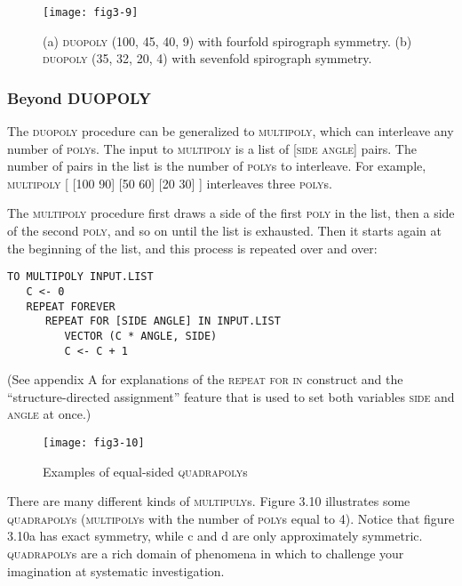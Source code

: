 \documentclass{book}
\begin{document}
\begin{figure}
\begin{center}
\texttt{[image: fig3-9]}
\caption{(a) \textsc{duopoly} (100, 45, 40, 9) with fourfold spirograph symmetry. (b) \textsc{duopoly} (35, 32, 20, 4) with sevenfold spirograph symmetry.}
\end{center}
\end{figure}

\subsubsection{Beyond DUOPOLY}

The \textsc{duopoly} procedure can be generalized to \textsc{multipoly}, which can
interleave any number of \textsc{poly}s. The input to \textsc{multipoly} is a list of
\textsc{[side angle]} pairs. The number of pairs in the list is the number of
\textsc{poly}s to interleave. For example,
\textsc{multipoly [ [100 90] [50 60] [20 30] ]}
interleaves three \textsc{poly}s.

The \textsc{multipoly} procedure first draws a side of the first \textsc{poly} in the
list, then a side of the second \textsc{poly}, and so on until the list is exhausted.
Then it starts again at the beginning of the list, and this process is
repeated over and over:

\begin{verbatim}
TO MULTIPOLY INPUT.LIST
   C <- 0
   REPEAT FOREVER
      REPEAT FOR [SIDE ANGLE] IN INPUT.LIST
         VECTOR (C * ANGLE, SIDE) 
         C <- C + 1
\end{verbatim}
(See appendix A for explanations of the \textsc{repeat}\textsc{ for}\textsc{ in} construct and the ``structure-directed assignment'' feature that is used to
set both variables \textsc{side} and \textsc{angle} at once.)

\begin{figure}
\begin{center}
\texttt{[image: fig3-10]}
\caption{Examples of equal-sided \textsc{quadrapoly}s}
\end{center}
\end{figure}

There are many different kinds of \textsc{multipuly}s. Figure 3.10 illustrates
some \textsc{quadrapoly}s (\textsc{multipoly}s with the number of \textsc{poly}s equal to 4).
Notice that figure 3.10a has exact symmetry, while c and d are only approximately symmetric. \textsc{quadrapoly}s are a rich domain of phenomena
in which to challenge your imagination at systematic investigation.
\end{document}
